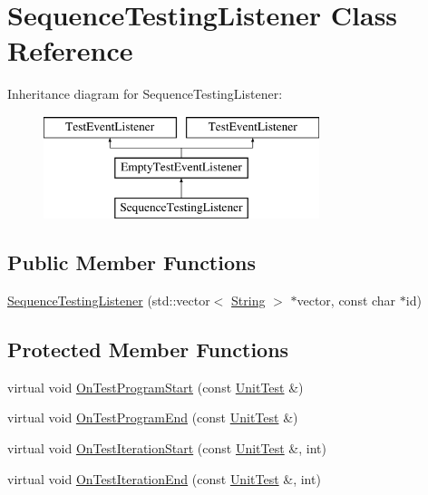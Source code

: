 \hypertarget{classSequenceTestingListener}{\section{\-Sequence\-Testing\-Listener \-Class \-Reference}
\label{d5/d3e/classSequenceTestingListener}
}
\-Inheritance diagram for \-Sequence\-Testing\-Listener\-:\begin{figure}[H]
\begin{center}
\leavevmode
\includegraphics[height=3.000000cm]{d5/d3e/classSequenceTestingListener}
\end{center}
\end{figure}
\subsection*{\-Public \-Member \-Functions}
\begin{DoxyCompactItemize}
\item 
\hyperlink{classSequenceTestingListener_a77ba82d3b8812a4269d3aec36fd0d4a6}{\-Sequence\-Testing\-Listener} (std\-::vector$<$ \hyperlink{classtesting_1_1internal_1_1String}{\-String} $>$ $\ast$vector, const char $\ast$id)
\end{DoxyCompactItemize}
\subsection*{\-Protected \-Member \-Functions}
\begin{DoxyCompactItemize}
\item 
virtual void \hyperlink{classSequenceTestingListener_a9d43d6e5c4c37ade824998de2d83bd20}{\-On\-Test\-Program\-Start} (const \hyperlink{classtesting_1_1UnitTest}{\-Unit\-Test} \&)
\item 
virtual void \hyperlink{classSequenceTestingListener_a79232f629150d6a1e560f6729271e729}{\-On\-Test\-Program\-End} (const \hyperlink{classtesting_1_1UnitTest}{\-Unit\-Test} \&)
\item 
virtual void \hyperlink{classSequenceTestingListener_abd0cb3cd389369f180bed8a9f855d30f}{\-On\-Test\-Iteration\-Start} (const \hyperlink{classtesting_1_1UnitTest}{\-Unit\-Test} \&, int)
\item 
virtual void \hyperlink{classSequenceTestingListener_ae2104e936a08019242b519d2274237eb}{\-On\-Test\-Iteration\-End} (const \hyperlink{classtesting_1_1UnitTest}{\-Unit\-Test} \&, int)
\end{DoxyCompactItemize}
